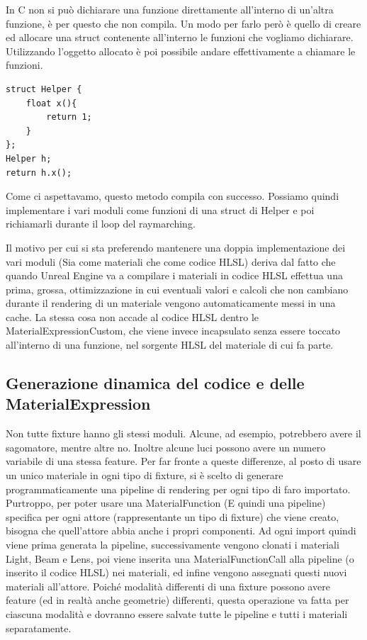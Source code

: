 \documentclass[main.tex]{subfiles}
\begin{document}
In C non si può dichiarare una funzione direttamente all'interno di un'altra funzione, è per questo che non compila. Un modo per farlo però è quello di creare ed allocare una struct contenente all'interno le funzioni che vogliamo dichiarare. Utilizzando l'oggetto allocato è poi possibile andare effettivamente a chiamare le funzioni.
\begin{lstlisting}
struct Helper {
    float x(){
        return 1;
    }
};
Helper h;
return h.x();
\end{lstlisting}
Come ci aspettavamo, questo metodo compila con successo. Possiamo quindi implementare i vari moduli come funzioni di una struct di Helper e poi richiamarli durante il loop del raymarching.

Il motivo per cui si sta preferendo mantenere una doppia implementazione dei vari moduli (Sia come materiali che come codice HLSL) deriva dal fatto che quando Unreal Engine va a compilare i materiali in codice HLSL effettua una prima, grossa, ottimizzazione in cui eventuali valori e calcoli che non cambiano durante il rendering di un materiale vengono automaticamente messi in una cache. La stessa cosa non accade al codice HLSL dentro le MaterialExpressionCustom, che viene invece incapsulato senza essere toccato all'interno di una funzione, nel sorgente HLSL del materiale di cui fa parte. \cite{hlslNoOptimize}

\lstset{language=UEcpp}
\subsection{Generazione dinamica del codice e delle MaterialExpression}\label{subsec:2_codeGeneration}
Non tutte fixture hanno gli stessi moduli. Alcune, ad esempio, potrebbero avere il sagomatore, mentre altre no. Inoltre alcune luci possono avere un numero variabile di una stessa feature. Per far fronte a queste differenze, al posto di usare un unico materiale in ogni tipo di fixture, si è scelto di generare programmaticamente una pipeline di rendering per ogni tipo di faro importato. Purtroppo, per poter usare una MaterialFunction (E quindi una pipeline) specifica per ogni attore (rappresentante un tipo di fixture) che viene creato, bisogna che quell'attore abbia anche i propri componenti. Ad ogni import quindi viene prima generata la pipeline, successivamente vengono clonati i materiali Light, Beam e Lens, poi viene inserita una MaterialFunctionCall alla pipeline (o inserito il codice HLSL) nei materiali, ed infine vengono assegnati questi nuovi materiali all'attore. 
Poiché modalità differenti di una fixture possono avere feature (ed in realtà anche geometrie) differenti, questa operazione va fatta per ciascuna modalità e dovranno essere salvate tutte le pipeline e tutti i materiali separatamente. \newline
\end{document}
